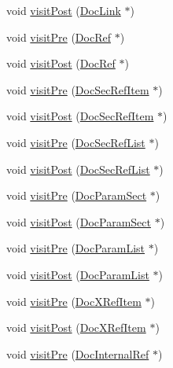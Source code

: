 \begin{DoxyCompactItemize}
\item 
void \hyperlink{class_xml_doc_visitor_aa330cbad66b307b81102d3dc4e61daaf}{visit\+Post} (\hyperlink{class_doc_link}{Doc\+Link} $\ast$)
\item 
void \hyperlink{class_xml_doc_visitor_a767fca1f9ec59fce5e3f8393aca613b4}{visit\+Pre} (\hyperlink{class_doc_ref}{Doc\+Ref} $\ast$)
\item 
void \hyperlink{class_xml_doc_visitor_af4fcaf57ae9fc752e863edc6592cd5bc}{visit\+Post} (\hyperlink{class_doc_ref}{Doc\+Ref} $\ast$)
\item 
void \hyperlink{class_xml_doc_visitor_aca47069f38674d76a87072865ceb2b71}{visit\+Pre} (\hyperlink{class_doc_sec_ref_item}{Doc\+Sec\+Ref\+Item} $\ast$)
\item 
void \hyperlink{class_xml_doc_visitor_a3e19110eee2821170afe9b43be9c6167}{visit\+Post} (\hyperlink{class_doc_sec_ref_item}{Doc\+Sec\+Ref\+Item} $\ast$)
\item 
void \hyperlink{class_xml_doc_visitor_a46654357a4c99cf6fb43602d2b0e3aeb}{visit\+Pre} (\hyperlink{class_doc_sec_ref_list}{Doc\+Sec\+Ref\+List} $\ast$)
\item 
void \hyperlink{class_xml_doc_visitor_ad016f439d95e88bc7e0ac7f5ec9ba717}{visit\+Post} (\hyperlink{class_doc_sec_ref_list}{Doc\+Sec\+Ref\+List} $\ast$)
\item 
void \hyperlink{class_xml_doc_visitor_a58255b71165c667c16c71a50183f44e2}{visit\+Pre} (\hyperlink{class_doc_param_sect}{Doc\+Param\+Sect} $\ast$)
\item 
void \hyperlink{class_xml_doc_visitor_a7a8bf16a19024dac1da82a6d0cccbb63}{visit\+Post} (\hyperlink{class_doc_param_sect}{Doc\+Param\+Sect} $\ast$)
\item 
void \hyperlink{class_xml_doc_visitor_a30efb223cb1f4dff327679fe8d01e471}{visit\+Pre} (\hyperlink{class_doc_param_list}{Doc\+Param\+List} $\ast$)
\item 
void \hyperlink{class_xml_doc_visitor_aa107301c13ee669cc4743ec1439e8366}{visit\+Post} (\hyperlink{class_doc_param_list}{Doc\+Param\+List} $\ast$)
\item 
void \hyperlink{class_xml_doc_visitor_a5fa78e5211698a75ec733bc0abe1103f}{visit\+Pre} (\hyperlink{class_doc_x_ref_item}{Doc\+X\+Ref\+Item} $\ast$)
\item 
void \hyperlink{class_xml_doc_visitor_a349ab23c55b07fd9e54d9529e06124f0}{visit\+Post} (\hyperlink{class_doc_x_ref_item}{Doc\+X\+Ref\+Item} $\ast$)
\item 
void \hyperlink{class_xml_doc_visitor_af052b6e0bf000dc49cbf4055b55e26ee}{visit\+Pre} (\hyperlink{class_doc_internal_ref}{Doc\+Internal\+Ref} $\ast$)

\end{DoxyCompactItemize}

